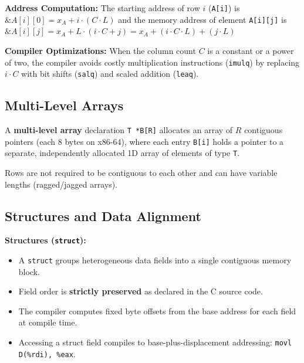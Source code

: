 \begin{theorem}
    \textbf{Address Computation:} The starting address of row $i$ (\texttt{A[i]}) is $\&A[i][0] = x_A + i \cdot (C \cdot L)$ and the memory address of element \texttt{A[i][j]} is $\&A[i][j] = x_A + L \cdot (i \cdot C + j) = x_A + (i \cdot C \cdot L) + (j \cdot L)$
\end{theorem}

\begin{remark}
    \textbf{Compiler Optimizations:} When the column count $C$ is a constant or a power of two, the compiler avoids costly multiplication instructions (\texttt{imulq}) by replacing $i \cdot C$ with bit shifts (\texttt{salq}) and scaled addition (\texttt{leaq}).
\end{remark}

\subsection{Multi-Level Arrays}

\begin{definition}
    A \textbf{multi-level array} declaration \texttt{T *B[R]} allocates an array of $R$ contiguous pointers (each 8 bytes on x86-64), where each entry \texttt{B[i]} holds a pointer to a separate, independently allocated 1D array of elements of type \texttt{T}.
\end{definition}

\begin{important}
    Rows are not required to be contiguous to each other and can have variable lengths (ragged/jagged arrays).
\end{important}

\subsection{Structures and Data Alignment}

\begin{definition}
    \textbf{Structures (\texttt{struct}):}
    \begin{itemize}
        \item A \texttt{struct} groups heterogeneous data fields into a single contiguous memory block.
        \item Field order is \textbf{strictly preserved} as declared in the C source code.
        \item The compiler computes fixed byte offsets from the base address for each field at compile time.
        \item Accessing a struct field compiles to base-plus-displacement addressing: \texttt{movl D(\%rdi), \%eax}.
    \end{itemize}
\end{definition}

